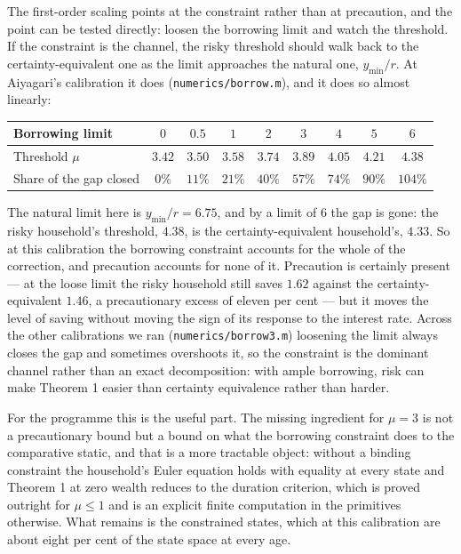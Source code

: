 The first-order scaling points at the constraint rather than at precaution, and the point can be
tested directly: loosen the borrowing limit and watch the threshold. If the constraint is the
channel, the risky threshold should walk back to the certainty-equivalent one as the limit
approaches the natural one, $y_{\min}/r$. At Aiyagari's calibration it does
(\texttt{numerics/borrow.m}), and it does so almost linearly:

\begingroup\small
\begin{center}
\begin{tabular}{@{}lcccccccc@{}}
\toprule
Borrowing limit & $0$ & $0.5$ & $1$ & $2$ & $3$ & $4$ & $5$ & $6$\\
\midrule
Threshold $\mu$ & $3.42$ & $3.50$ & $3.58$ & $3.74$ & $3.89$ & $4.05$ & $4.21$ & $4.38$\\
Share of the gap closed & $0\%$ & $11\%$ & $21\%$ & $40\%$ & $57\%$ & $74\%$ & $90\%$ & $104\%$\\
\bottomrule
\end{tabular}
\end{center}
\endgroup

The natural limit here is $y_{\min}/r=6.75$, and by a limit of $6$ the gap is gone: the risky
household's threshold, $4.38$, is the certainty-equivalent household's, $4.33$. So at this
calibration the borrowing constraint accounts for the whole of the correction, and precaution
accounts for none of it. Precaution is certainly present --- at the loose limit the risky
household still saves $1.62$ against the certainty-equivalent $1.46$, a precautionary excess of
eleven per cent --- but it moves the level of saving without moving the sign of its response to
the interest rate. Across the other calibrations we ran (\texttt{numerics/borrow3.m}) loosening
the limit always closes the gap and sometimes overshoots it, so the constraint is the dominant
channel rather than an exact decomposition: with ample borrowing, risk can make Theorem 1 easier
than certainty equivalence rather than harder.

For the programme this is the useful part. The missing ingredient for $\mu=3$ is not a
precautionary bound but a bound on what the borrowing constraint does to the comparative static,
and that is a more tractable object: without a binding constraint the household's Euler equation
holds with equality at every state and Theorem 1 at zero wealth reduces to the duration criterion,
which is proved outright for $\mu\le1$ and is an explicit finite computation in the primitives
otherwise. What remains is the constrained states, which at this calibration are about eight per
cent of the state space at every age.

